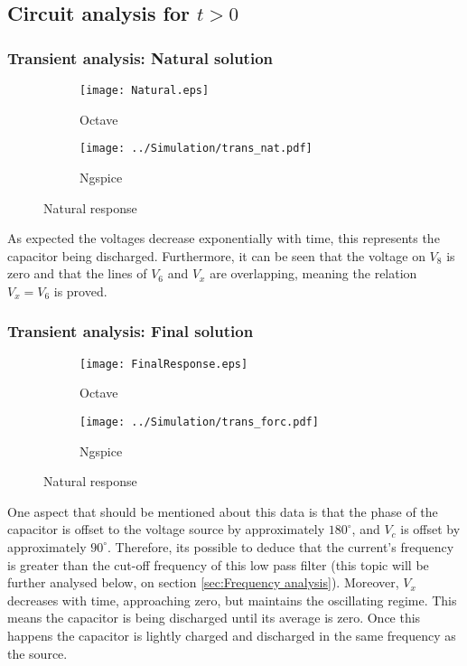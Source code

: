 \subsection{Circuit analysis for $t>0$}
\subsubsection{Transient analysis: Natural solution}



\begin{figure}[H]
\centering
\begin{subfigure}{.5\textwidth}
  \centering
  \texttt{[image: Natural.eps]}
  \caption{Octave}
\end{subfigure}%
\begin{subfigure}{.5\textwidth}
  \centering
  \texttt{[image: ../Simulation/trans\_nat.pdf]}
  \caption{Ngspice}
\end{subfigure}
\caption{Natural response}
\label{fig:test}
\end{figure}


\indent

As expected the voltages decrease exponentially with time, this represents the capacitor being discharged. Furthermore, it can be seen that the voltage on $V_8$ is zero and that the lines of $V_6$ and $V_x$ are overlapping, meaning the relation $V_x = V_6$ is proved.

\subsubsection{Transient analysis: Final solution}

\indent


\begin{figure}[H]
\centering
\begin{subfigure}{.5\textwidth}
  \centering
  \texttt{[image: FinalResponse.eps]}
  \caption{Octave}
\end{subfigure}%
\begin{subfigure}{.5\textwidth}
  \centering
  \texttt{[image: ../Simulation/trans\_forc.pdf]}
  \caption{Ngspice}
\end{subfigure}
\caption{Natural response}
\label{fig:test}
\end{figure}



One aspect that should be mentioned about this data is that the phase of the capacitor is offset to the voltage source by approximately $180^\circ$, and $V_c$ is offset by approximately $90^\circ$. Therefore, its possible to deduce that the current's frequency is greater than the cut-off frequency of this low pass filter (this topic will be further analysed below, on section \ref{sec:Frequency analysis}).
Moreover, $V_x$ decreases with time, approaching zero, but maintains the oscillating regime. This means the capacitor is being discharged until its average is zero. Once this happens the capacitor is lightly charged and discharged in the same frequency as the source.

